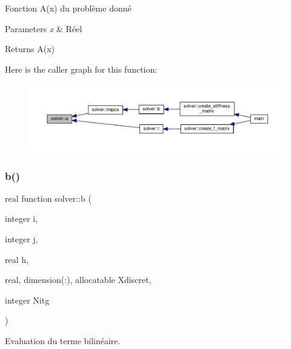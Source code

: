 Fonction A(x) du problème donné 


\begin{DoxyParams}{Parameters}
{\em x} & Réel \\
\hline
\end{DoxyParams}
\begin{DoxyReturn}{Returns}
A(x) 
\end{DoxyReturn}
Here is the caller graph for this function\+:\nopagebreak
\begin{figure}[H]
\begin{center}
\leavevmode
\includegraphics[width=350pt]{namespacesolver_ab0081bb7880652eb26e65994f13fcb54_icgraph}
\end{center}
\end{figure}
\mbox{\label{namespacesolver_a99565d1c8ed5142211b78fe3ccca060b}} 
\subsubsection{\texorpdfstring{b()}{b()}}
{\footnotesize\ttfamily real function solver\+::b (\begin{DoxyParamCaption}\item[{integer}]{i,  }\item[{integer}]{j,  }\item[{real}]{h,  }\item[{real, dimension(\+:), allocatable}]{Xdiscret,  }\item[{integer}]{Nitg }\end{DoxyParamCaption})}



Evaluation du terme bilinéaire. 


